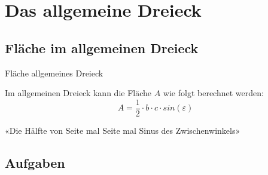 
\newpage
\section{Das allgemeine Dreieck}

\subsection{Fläche im allgemeinen Dreieck}


\begin{gesetz}{Fläche allgemeines Dreieck}{}
  
Im allgemeinen Dreieck kann die Fläche $A$ wie folgt berechnet werden: 
$$A = \frac{1}{2}\cdot{}b\cdot{}c\cdot{}sin(\varepsilon)$$

«Die Hälfte von Seite mal Seite mal Sinus des Zwischenwinkels»

\end{gesetz}


\subsection*{Aufgaben}
\newpage

